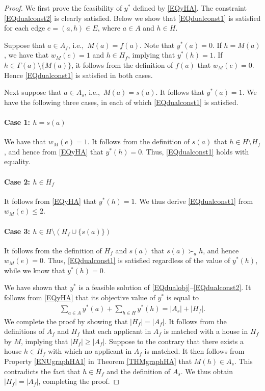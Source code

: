 \documentclass[11pt,a4paper,showkeys]{article}
\theoremstyle{plain}
\theoremstyle{definition}
\begin{document}
\begin{proof}
    We first prove the feasibility of $y^*$ defined by \eqref{EQyHA}. 
    The constraint \eqref{EQdualconst2} is clearly satisfied. 
    Below we show that \eqref{EQdualconst1} is satisfied for each edge $e=(a,h)\in E$, 
    where $a\in A$ and $h\in H$. 

    Suppose that $a\in A_f$, 
    i.e.,\ 
    $M(a)=f(a)$. 
    Note that $y^*(a)=0$. 
    If $h=M(a)$, 
    we have that 
    $w_M(e)=1$ and $h\in H_f$, 
    implying that $y^*(h)=1$. 
    If $h\in \Gamma(a)  \setminus \{ M(a)\}$, 
    it follows from the definition of $f(a)$ that $w_M(e)=0$. 
    Hence \eqref{EQdualconst1} is satisfied in both cases. 

    Next suppose that $a\in A_s$, 
    i.e.,\ 
    $M(a)=s(a)$. 
    It follows that $y^*(a)=1$. 
    We have the following three cases, 
    in each of which \eqref{EQdualconst1} is satisfied. 
        \paragraph{Case 1: $h=s(a)$} We have that $w_M(e)=1$. 
        It follows from the definition of $s(a)$ that $h\in H \setminus H_f$, and hence from \eqref{EQyHA} that $y^*(h)=0$. 
        Thus, 
        \eqref{EQdualconst1} holds with equality. 
        \paragraph{Case 2: $h\in H_f$} It follows from \eqref{EQyHA} that $y^*(h)=1$. 
        We thus derive \eqref{EQdualconst1} from $w_M(e)\le 2$. 
        \paragraph{Case 3: $h\in H\setminus (H_f \cup \{s(a)\})$}
        It follows from the definition of $H_f$ and $s(a)$ that $s(a)\succ_a h$, 
        and hence $w_M(e)=0$. 
        Thus, \eqref{EQdualconst1} is satisfied regardless of the value of $y^*(h)$, 
        while we know that $y^*(h)=0$. 

    We have shown that $y^*$ is a feasible solution of \eqref{EQdualobj}--\eqref{EQdualconst2}. 
    It follows from \eqref{EQyHA} that its objective value of $y^*$ is equal to 
    \begin{align}
    \sum_{a\in A} y^*(a) + \sum_{h\in H} y^*(h) = |A_s| + |H_f|. 
    \label{EQobjHA}
    \end{align}
    We complete the proof by showing that $|H_f| = |A_f|$. 
    It follows from the definitions of $A_f$ and $H_f$ that each applicant in $A_f$ is matched with a house in $H_f$ by $M$, 
    implying that $|H_f|\ge |A_f|$. 
    Suppose to the  contrary that there exists a house $h\in H_f$ with which no applicant in $A_f$ is matched. 
    It then follows from Property \ref{ENUgraphHA1} in Theorem \ref{THMgraphHA} that $M(h)\in A_s$. 
    This contradicts the fact that $h\in H_f$ and the definition of $A_s$. 
    We thus obtain $|H_f| = |A_f|$, 
    completing the proof. 
\end{proof}
\end{document}
